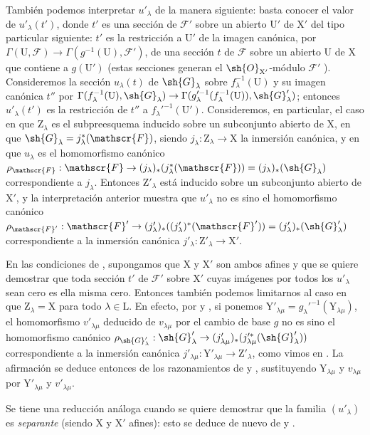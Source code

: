 \begin{env}[11.9.5]
También podemos interpretar $u'_\lambda$ de la manera siguiente: basta conocer el valor de $u'_\lambda(t')$, donde $t'$ es una sección de $\mathscr{F}'$ sobre un abierto $\mathrm{U}'$ de $\mathrm{X}'$ del tipo particular siguiente: $t'$ es la restricción a $\mathrm{U}'$ de la imagen canónica, por $\Gamma(\mathrm{U},\mathscr{F})\to\Gamma(g^{-1}(\mathrm{U}),\mathscr{F}')$, de una sección $t$ de $\mathscr{F}$ sobre un abierto $\mathrm{U}$ de $\mathrm{X}$ que contiene a $g(\mathrm{U}')$ (estas secciones generan el $\sh{O}_{\mathrm{X}'}$-módulo $\mathscr{F}'$ ).
Consideremos la sección $u_\lambda(t)$ de $\sh{G}_\lambda$ sobre $f_\lambda^{-1}(\mathrm{U})$ y su imagen canónica $t''$ por $\Gamma(f_\lambda^{-1}(\mathrm{U}),\sh{G}_\lambda)\to\Gamma(g_\lambda'^{-1}(f_\lambda^{-1}(\mathrm{U})),\sh{G}'_\lambda)$; entonces $u'_\lambda(t')$ es la restricción de $t''$ a $f_\lambda'^{-1}(\mathrm{U}')$.
Consideremos, en particular, el caso en que $\mathrm{Z}_\lambda$ es el subpreesquema inducido sobre un subconjunto abierto de $\mathrm{X}$, en que $\sh{G}_\lambda=j_\lambda^*(\mathscr{F})$, siendo $j_\lambda:\mathrm{Z}_\lambda\to\mathrm{X}$ la inmersión canónica, y en que $u_\lambda$ es el homomorfismo canónico $\rho_\mathscr{F}:\mathscr{F}\to(j_\lambda)_*(j_\lambda^*(\mathscr{F}))=(j_\lambda)_*(\sh{G}_\lambda)$  correspondiente a $j_\lambda$.
Entonces $\mathrm{Z}'_\lambda$ está inducido sobre un subconjunto abierto de $\mathrm{X}'$, y la interpretación anterior muestra que $u'_\lambda$ no es sino el homomorfismo canónico $\rho_{\mathscr{F}'}:\mathscr{F}'\to(j'_\lambda)_*((j'_\lambda)^*(\mathscr{F}'))=(j'_\lambda)_*(\sh{G}'_\lambda)$ correspondiente a la inmersión canónica $j'_\lambda:\mathrm{Z}'_\lambda\to\mathrm{X}'$.
\end{env}

\begin{env}[11.9.6]
\label{IV.11.9.6}
En las condiciones de , supongamos que $\mathrm{X}$ y $\mathrm{X}'$ son ambos afines y que se quiere demostrar que toda sección $t'$ de $\mathscr{F}'$ sobre $\mathrm{X}'$ cuyas imágenes por todos los $u'_\lambda$ sean cero es ella misma cero.
Entonces también podemos limitarnos al caso en que $\mathrm{Z}_\lambda=\mathrm{X}$ para todo $\lambda\in\mathrm{L}$.
En efecto, por  y , si ponemos $\mathrm{Y}'_{\lambda\mu}=g_\lambda'^{-1}(\mathrm{Y}_{\lambda\mu})$, el homomorfismo $v'_{\lambda\mu}$ deducido de $v_{\lambda\mu}$ por el cambio de base $g$ no es sino el homomorfismo canónico
$\rho_{\sh{G}'_\lambda}:\sh{G}'_\lambda\to(j'_{\lambda\mu})_*(j_{\lambda\mu}'^*(\sh{G}'_\lambda))$ correspondiente a la inmersión canónica $j'_{\lambda\mu}:\mathrm{Y}'_{\lambda\mu}\to\mathrm{Z}'_\lambda$, como vimos en .
La afirmación se deduce entonces de los razonamientos de  y , sustituyendo $\mathrm{Y}_{\lambda\mu}$ y $v_{\lambda\mu}$ por $\mathrm{Y}'_{\lambda\mu}$ y $v'_{\lambda\mu}$.

Se tiene una reducción análoga cuando se quiere demostrar que la familia $(u'_\lambda)$ es \emph{separante} (siendo $\mathrm{X}$ y $\mathrm{X}'$ afines): esto se deduce de nuevo de  y .
\end{env}

